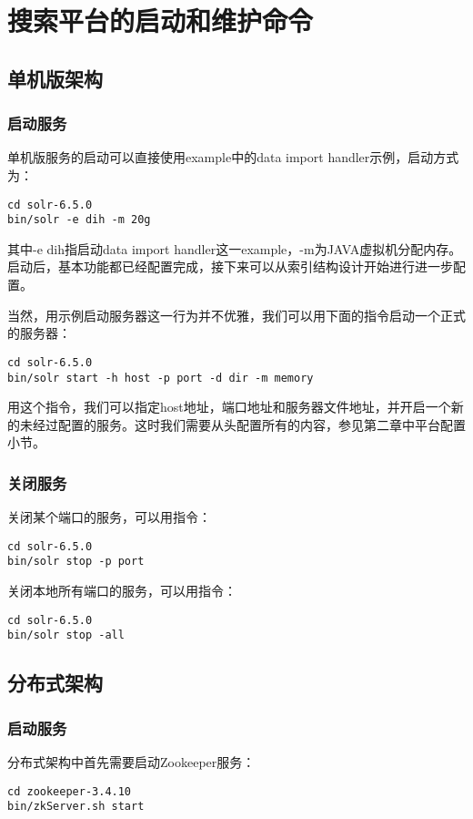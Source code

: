\chapter{搜索平台的启动和维护命令}

\section{单机版架构}
\subsection{启动服务}
单机版服务的启动可以直接使用example中的data import handler示例，启动方式为：
\begin{lstlisting}[basicstyle=\small\ttfamily, numbers=none]
cd solr-6.5.0
bin/solr -e dih -m 20g
\end{lstlisting}

其中-e dih指启动data import handler这一example，-m为JAVA虚拟机分配内存。启动后，基本功能都已经配置完成，接下来可以从索引结构设计开始进行进一步配置。

当然，用示例启动服务器这一行为并不优雅，我们可以用下面的指令启动一个正式的服务器：
\begin{lstlisting}[basicstyle=\small\ttfamily, numbers=none]
cd solr-6.5.0
bin/solr start -h host -p port -d dir -m memory
\end{lstlisting}

用这个指令，我们可以指定host地址，端口地址和服务器文件地址，并开启一个新的未经过配置的服务。这时我们需要从头配置所有的内容，参见第二章中平台配置小节。

\subsection{关闭服务}
关闭某个端口的服务，可以用指令：
\begin{lstlisting}[basicstyle=\small\ttfamily, numbers=none]
cd solr-6.5.0
bin/solr stop -p port
\end{lstlisting}

关闭本地所有端口的服务，可以用指令：
\begin{lstlisting}[basicstyle=\small\ttfamily, numbers=none]
cd solr-6.5.0
bin/solr stop -all
\end{lstlisting}

\section{分布式架构}
\subsection{启动服务}
分布式架构中首先需要启动Zookeeper服务：
\begin{lstlisting}[basicstyle=\small\ttfamily, numbers=none]
cd zookeeper-3.4.10
bin/zkServer.sh start
\end{lstlisting}

